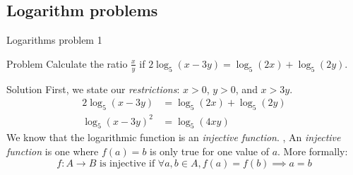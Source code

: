 \subsection{Logarithm problems}
\begin{namedframe}{Logarithms problem 1}
	\begin{exampleblock}{Problem}
		Calculate the ratio $\frac{x}{y}$ if $2\log_5(x-3y) = \log_5(2x) + \log_5(2y)$.
	\end{exampleblock}
	\pause
	\begin{block}{Solution}
		First, we state our \emph{restrictions}: \pause $x > 0$, $y > 0$, and $x > 3y$.
		\pause
		\begin{align*}
			2\log_5(x-3y)  &= \log_5(2x) + \log_5(2y)\\
			\log_5(x-3y)^2 &= \log_5(4xy)
		\end{align*}
		\pause
		We know that the logarithmic function is an \emph{injective function}.
		\sep
		An \emph{injective function} is one where $f(a) = b$ is only true for one value of $a$.
		More formally:
		\vspace{-2ex}
		\[f \colon A \to B \text{ is injective if } \forall a, b \in A, f(a) = f(b) \implies a = b\]
		\vspace{-4ex}
	\end{block}
\end{namedframe}
